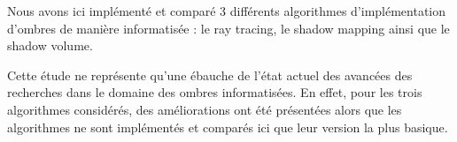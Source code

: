 \documentclass[a4paper,12pt]{report}
\begin{document}
Nous avons ici implémenté et comparé 3 différents algorithmes d'implémentation d'ombres de manière informatisée : le ray tracing, le shadow mapping ainsi que le shadow volume.

Cette étude ne représente qu'une ébauche de l'état actuel des avancées des recherches dans le domaine des ombres informatisées. En effet, pour les trois algorithmes considérés, des améliorations ont été présentées alors que les algorithmes ne sont implémentés et comparés ici que leur version la plus basique.





\end{document}
